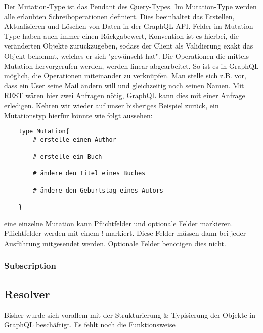 Der Mutation-Type ist das Pendant des Query-Types. Im Mutation-Type werden alle erlaubten Schreiboperationen definiert.
Dies beeinhaltet das Erstellen, Aktualisieren und Löschen von Daten in der GraphQL-API.
Felder im Mutation-Type haben auch immer einen Rückgabewert, Konvention ist es hierbei, die veränderten Objekte zurückzugeben,
sodass der Client als Validierung exakt das Objekt bekommt, welches er sich "gewünscht hat".
Die Operationen die mittels Mutation hervorgerufen werden, werden linear abgearbeitet. So ist es in GraphQL möglich, die
Operationen miteinander zu verknüpfen. Man stelle sich z.B. vor, dass ein User seine Mail ändern will und gleichzeitig noch
seinen Namen. Mit REST wären hier zwei Anfragen nötig, GraphQL kann dies mit einer Anfrage erledigen.
Kehren wir wieder auf unser bisheriges Beispiel zurück, ein Mutationstyp hierfür könnte wie folgt aussehen:

\begin{verbatim}
    type Mutation{
        # erstelle einen Author

        # erstelle ein Buch

        # ändere den Titel eines Buches

        # ändere den Geburtstag eines Autors

    }
\end{verbatim}

eine einzelne Mutation kann Pflichtfelder und optionale Felder markieren.
Pflichtfelder werden mit einem ! markiert. Diese Felder müssen dann bei jeder Ausführung mitgesendet werden.
Optionale Felder benötigen dies nicht.







\subsubsection{Subscription}



\subsection{Resolver}

Bisher wurde sich vorallem mit der Strukturierung & Typisierung der Objekte in GraphQL beschäftigt.
Es fehlt noch die Funktionsweise

